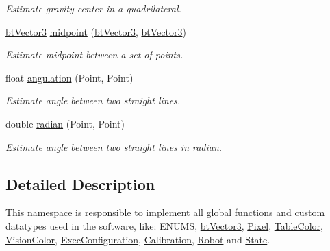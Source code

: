 \begin{DoxyCompactItemize}
\begin{DoxyCompactList}\small\item\em Estimate gravity center in a quadrilateral. \end{DoxyCompactList}\item 
\hypertarget{namespacecommon_a8018da38b6ea9b1dfa514730ad24ab2b}{\hyperlink{structcommon_1_1btVector3}{bt\-Vector3} \hyperlink{namespacecommon_a8018da38b6ea9b1dfa514730ad24ab2b}{midpoint} (\hyperlink{structcommon_1_1btVector3}{bt\-Vector3}, \hyperlink{structcommon_1_1btVector3}{bt\-Vector3})}\label{namespacecommon_a8018da38b6ea9b1dfa514730ad24ab2b}

\begin{DoxyCompactList}\small\item\em Estimate midpoint between a set of points. \end{DoxyCompactList}\item 
float \hyperlink{namespacecommon_a8c1ef8d4ce3fdb3e30af47c9c11bf04a}{angulation} (Point, Point)
\begin{DoxyCompactList}\small\item\em Estimate angle between two straight lines. \end{DoxyCompactList}\item 
\hypertarget{namespacecommon_ac58a1918510dc4dbc7b65255593df38e}{double \hyperlink{namespacecommon_ac58a1918510dc4dbc7b65255593df38e}{radian} (Point, Point)}\label{namespacecommon_ac58a1918510dc4dbc7b65255593df38e}

\begin{DoxyCompactList}\small\item\em Estimate angle between two straight lines in radian. \end{DoxyCompactList}\end{DoxyCompactItemize}


\subsection{Detailed Description}
This namespace is responsible to implement all global functions and custom datatypes used in the software, like\-: E\-N\-U\-M\-S, \hyperlink{structcommon_1_1btVector3}{bt\-Vector3}, \hyperlink{structcommon_1_1Pixel}{Pixel}, \hyperlink{structcommon_1_1TableColor}{Table\-Color}, \hyperlink{structcommon_1_1VisionColor}{Vision\-Color}, \hyperlink{structcommon_1_1ExecConfiguration}{Exec\-Configuration}, \hyperlink{structcommon_1_1Calibration}{Calibration}, \hyperlink{structcommon_1_1Robot}{Robot} and \hyperlink{structcommon_1_1State}{State}. 

